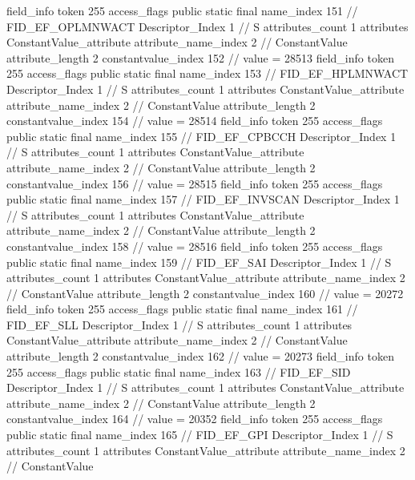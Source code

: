 {{{{{{{				}
				}
			}
			field_info {
				token	255
				access_flags	public static final
				name_index	151		// FID_EF_OPLMNWACT
				Descriptor_Index	1		// S
				attributes_count	1
				attributes {
				ConstantValue_attribute {
					attribute_name_index	2		// ConstantValue
					attribute_length	2
					constantvalue_index	152		// value = 28513
				}
				}
			}
			field_info {
				token	255
				access_flags	public static final
				name_index	153		// FID_EF_HPLMNWACT
				Descriptor_Index	1		// S
				attributes_count	1
				attributes {
				ConstantValue_attribute {
					attribute_name_index	2		// ConstantValue
					attribute_length	2
					constantvalue_index	154		// value = 28514
				}
				}
			}
			field_info {
				token	255
				access_flags	public static final
				name_index	155		// FID_EF_CPBCCH
				Descriptor_Index	1		// S
				attributes_count	1
				attributes {
				ConstantValue_attribute {
					attribute_name_index	2		// ConstantValue
					attribute_length	2
					constantvalue_index	156		// value = 28515
				}
				}
			}
			field_info {
				token	255
				access_flags	public static final
				name_index	157		// FID_EF_INVSCAN
				Descriptor_Index	1		// S
				attributes_count	1
				attributes {
				ConstantValue_attribute {
					attribute_name_index	2		// ConstantValue
					attribute_length	2
					constantvalue_index	158		// value = 28516
				}
				}
			}
			field_info {
				token	255
				access_flags	public static final
				name_index	159		// FID_EF_SAI
				Descriptor_Index	1		// S
				attributes_count	1
				attributes {
				ConstantValue_attribute {
					attribute_name_index	2		// ConstantValue
					attribute_length	2
					constantvalue_index	160		// value = 20272
				}
				}
			}
			field_info {
				token	255
				access_flags	public static final
				name_index	161		// FID_EF_SLL
				Descriptor_Index	1		// S
				attributes_count	1
				attributes {
				ConstantValue_attribute {
					attribute_name_index	2		// ConstantValue
					attribute_length	2
					constantvalue_index	162		// value = 20273
				}
				}
			}
			field_info {
				token	255
				access_flags	public static final
				name_index	163		// FID_EF_SID
				Descriptor_Index	1		// S
				attributes_count	1
				attributes {
				ConstantValue_attribute {
					attribute_name_index	2		// ConstantValue
					attribute_length	2
					constantvalue_index	164		// value = 20352
				}
				}
			}
			field_info {
				token	255
				access_flags	public static final
				name_index	165		// FID_EF_GPI
				Descriptor_Index	1		// S
				attributes_count	1
				attributes {
				ConstantValue_attribute {
					attribute_name_index	2		// ConstantValue
}}}}}}}

